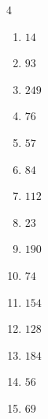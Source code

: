 \begin{multicols}{4}
\begin{enumerate}
\columnbreak %

  \item $14$


  \item $93$


  \item $249$


  \item $76$


  \item $57$


  \item $84$


  \item $112$


  \item $23$


  \item $190$


  \item $74$


  \item $154$


  \item $128$


  \item $184$


  \item $56$


  \item $69$


\columnbreak %


\end{enumerate}
\end{multicols}
